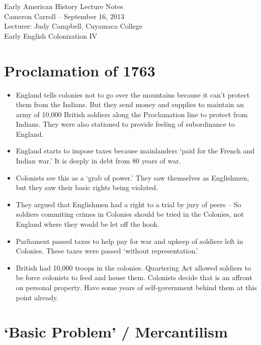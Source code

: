\documentclass{article}
\begin{document}
  \begin{center}
    {\small{} Early American History Lecture Notes} \\[0.6cm]
    {\small{} Cameron Carroll -- September 16, 2013} \\[0.6cm]
    {\small{} Lecturer: Judy Campbell, Cuyamaca College}\\[1cm]
    {\small{} Early English Colonization IV}\\[1cm]
  \end{center}
  
  \tableofcontents
  \newpage

\section{Proclamation of 1763}
  \begin{itemize}
    \item England tells colonies not to go over the mountains because it can't protect them from the Indians. But they send money and supplies to maintain an army of 10,000 British soldiers along the Proclamation line to protect from Indians. They were also stationed to provide feeling of subordinance to England. 
    \item England starts to impose taxes because mainlanders `paid for the French and Indian war.' It is deeply in debt from 80 years of war.
    \item Colonists see this as a `grab of power.' They saw themselves as Englishmen, but they saw their basic rights being violated. 
    \item They argued that Englishmen had a right to a trial by jury of peers -- So soldiers commiting crimes in Colonies should be tried in the Colonies, not England where they would be let off the hook.
    \item Parliament passed taxes to help pay for war and upkeep of soldiers left in Colonies. These taxes were passed `without representation.' 
    \item British had 10,000 troops in the colonies. Quartering Act allowed soldiers to be force colonists to feed and house them. Colonists decide that is an affront on personal property. Have some years of self-government behind them at this point already. 
  \end{itemize}

\section{`Basic Problem' / Mercantilism}
\end{document}
